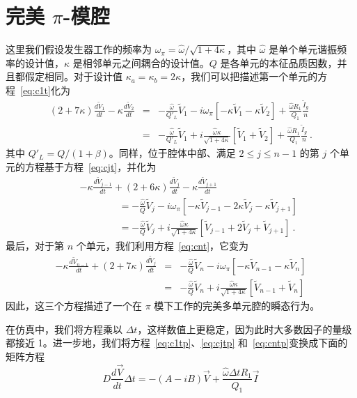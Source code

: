 \documentclass[12pt]{article}
\newcommand\tV{\tilde V}
\newcommand\ho{\hat\omega}
\newcommand\opi{\omega_{\pi}}
\newcommand\dt{\Delta t}
\begin{document}
\section{完美 $\pi$-模腔}
%
这里我们假设发生器工作的频率为 $\opi=\ho/\sqrt{1+4\kappa}$，其中 $\ho$ 是单个单元谐振频率的设计值，$\kappa$ 是相邻单元之间耦合的设计值。$Q$ 是各单元的本征品质因数，并且都假定相同。对于设计值 $\kappa_a=\kappa_b=2\kappa$，我们可以把描述第一个单元的方程~\ref{eq:c1t}化为
\begin{eqnarray}\label{eq:c1tp}
\left(2+7\kappa\right)\frac{d\tV_1}{dt} -\kappa\frac{d\tV_2}{dt}
     &=&-\frac{\ho}{Q'_L}\tV_1
        -i\opi\left[-\kappa\tV_1
         -\kappa\tV_2\right] + \frac{\ho R_1}{Q_1}\frac{\tilde I_g}{n}\\
     &=&-\frac{\ho}{Q'_L}\tV_1
         +i\frac{\ho\kappa}{\sqrt{1+4\kappa}}\left[\tV_1+\tV_2\right]
         + \frac{\ho R_1}{Q_1}\frac{\tilde I_g}{n}\ .\nonumber
\end{eqnarray}
其中 $Q'_L=Q/(1+\beta)$。同样，位于腔体中部、满足 $2\leq j \leq n-1$ 的第 $j$ 个单元的方程基于方程~\ref{eq:cjt}，并化为
\begin{eqnarray}\label{eq:cjtp}
&&  -\kappa \frac{d\tV_{j-1}}{dt} +\left(2+6\kappa\right)\frac{d\tV_j}{dt}
     -\kappa \frac{d\tV_{j+1}}{dt}\nonumber\\
   &&\qquad\qquad= -\frac{\ho}{Q}\tV_j-i\opi\left[-\kappa\tV_{j-1}
      -2\kappa\tV_j-\kappa\tV_{j+1} \right] \\
  &&\qquad\qquad = -\frac{\ho}{Q}\tV_j+i\frac{\ho\kappa}{\sqrt{1+4\kappa}}
     \left[\tV_{j-1} +2\tV_j+\tV_{j+1} \right]\ .\nonumber
\end{eqnarray}
最后，对于第 $n$ 个单元，我们利用方程~\ref{eq:cnt}，它变为
\begin{eqnarray}\label{eq:cntp}
  -\kappa \frac{d\tV_{n-1}}{dt}+\left(2+7\kappa\right)\frac{d\tV_j}{dt} 
  &=& -\frac{\ho}{Q}\tV_n -i\opi\left[-\kappa\tV_{n-1}-\kappa\tV_n\right]\\
  &=& -\frac{\ho}{Q}\tV_n +i\frac{\ho\kappa}{\sqrt{1+4\kappa}}
      \left[\tV_{n-1}+\tV_n\right]\nonumber
\end{eqnarray}
因此，这三个方程描述了一个在 $\pi$ 模下工作的完美多单元腔的瞬态行为。
\par
在仿真中，我们将方程乘以 $\dt$，这样数值上更稳定，因为此时大多数因子的量级都接近 1。进一步地，我们将方程~\ref{eq:c1tp}、\ref{eq:cjtp} 和~\ref{eq:cntp}变换成下面的矩阵方程
\begin{equation}\label{eq:dynp}
  D\frac{d\vec V}{dt}\dt = -(A-iB)\vec V +\frac{\ho\dt R_1}{Q_1}\vec I
\end{equation}
\end{document}

